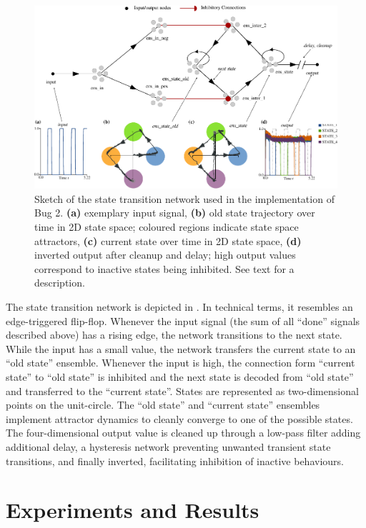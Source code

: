 \documentclass[letterpaper,10pt,conference]{ieeeconf}
\begin{document}
\begin{figure}
	\centering
	\includegraphics{media/nengo_state_network.pdf}
	\caption{Sketch of the state transition network used in the implementation of Bug 2. \textbf{(a)} exemplary input signal, \textbf{(b)} old state trajectory over time in 2D state space; coloured regions indicate state space attractors, \textbf{(c)} current state over time in 2D state space, \textbf{(d)} inverted output after cleanup and delay; high output values correspond to inactive states being inhibited. See text for a description.}
	\label{fig:nengo_state_network}
\end{figure}
The state transition network is depicted in . In technical terms, it resembles an edge-triggered flip-flop. Whenever the input signal (the sum of all \enquote{done} signals described above) has a rising edge, the network transitions to the next state. While the input has a small value, the network transfers the current state to an \enquote{old state} ensemble. Whenever the input is high, the connection form \enquote{current state} to \enquote{old state} is inhibited and the next state is decoded from \enquote{old state} and transferred to the \enquote{current state}. States are represented as two-dimensional points on the unit-circle. The \enquote{old state} and \enquote{current state} ensembles implement attractor dynamics \cite{eliasmith2005unified,eliasmith2007attractor} to cleanly converge to one of the possible states. The four-dimensional output value is cleaned up through a low-pass filter adding additional delay, a hysteresis network preventing unwanted transient state transitions, and finally inverted, facilitating inhibition of inactive behaviours.


\section{Experiments and Results}
\label{sec:experiments}
\end{document}
